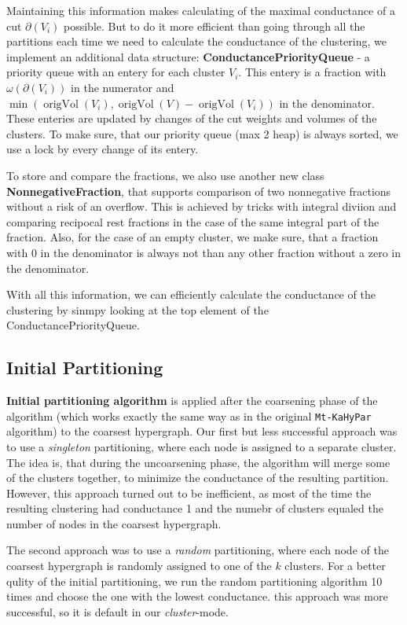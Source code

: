 \documentclass[acmsmall,nonacm,screen,review]{acmart}
\DeclareMathOperator{\origVol}{origVol}
\begin{document}
Maintaining this information makes calculating of the maximal conductance of 
a cut $\partial(V_i)$ possible. But to do it more efficient than going through 
all the partitions each time we need to calculate the conductance of the clustering, 
we implement an additional data structure: \textbf{ConductancePriorityQueue} - a 
priority queue with an entery for each cluster $V_i$. This entery is a fraction with 
$\omega(\partial(V_i))$ in the numerator and 
$\min(\origVol(V_i), \origVol(V) - \origVol(V_i))$ in the denominator. These 
enteries are updated by changes of the cut weights and volumes of the clusters.
To make sure, that our priority queue (max 2 heap) is always sorted, we use a
lock by every change of its entery.

To store and compare the fractions, we also use another new class 
\textbf{NonnegativeFraction}, that supports comparison of two nonnegative fractions 
without a risk of an overflow. This is achieved by tricks with integral diviion and
comparing recipocal rest fractions in the case of the same integral part of the 
fraction. Also, for the case of an empty cluster, we make sure, that a fraction
with $0$ in the denominator is always not than any other fraction without a zero in 
the denominator.

\smallbreak
With all this information, we can efficiently calculate the conductance of the
clustering by sinmpy looking at the top element of the ConductancePriorityQueue.

\subsection{Initial Partitioning}
\textbf{Initial partitioning algorithm} is applied 
after the coarsening phase of the algorithm (which works exactly
the same way as in the original \texttt{Mt-KaHyPar} algorithm) to
the coarsest hypergraph. Our first but less successful approach was
to use a \textit{singleton} partitioning, where each node is assigned
to a separate cluster. The idea is, that during the uncoarsening phase,
the algorithm will merge some of the clusters together, to minimize the
conductance of the resulting partition. However, this approach
turned out to be inefficient, as most of the time the resulting
clustering had conductance 1 and the numebr of clusters equaled the number
of nodes in the coarsest hypergraph.

The second approach was to use a \textit{random} partitioning, where
each node of the coarsest hypergraph is randomly assigned to one of the 
$k$ clusters. For a better qulity of the initial partitioning, we run
the random partitioning algorithm 10 times and choose the one with the
lowest conductance. this approach was more successful, so it is default
in our \textit{cluster}-mode.
\end{document}
